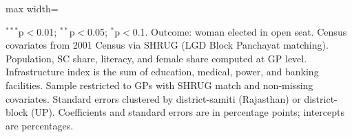 \begin{adjustbox}{max width=\linewidth}
\begin{threeparttable}[b]
      \begin{tablenotes}
         \item $^{***}$p$<$0.01; $^{**}$p$<$0.05; $^{*}$p$<$0.1. Outcome: woman elected in open seat. Census covariates from 2001 Census via SHRUG (LGD Block Panchayat matching). Population, SC share, literacy, and female share computed at GP level. Infrastructure index is the sum of education, medical, power, and banking facilities. Sample restricted to GPs with SHRUG match and non-missing covariates. Standard errors clustered by district-samiti (Rajasthan) or district-block (UP). Coefficients and standard errors are in percentage points; intercepts are percentages.
      \end{tablenotes}
   \end{threeparttable}
\end{adjustbox}
\par\endgroup


